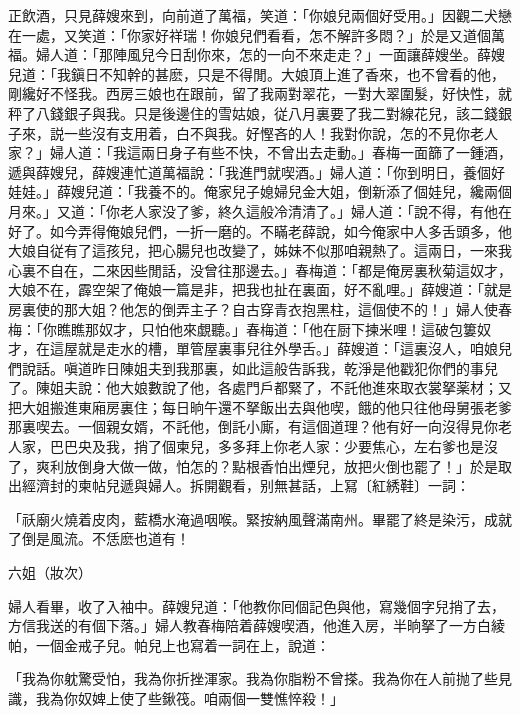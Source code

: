 正飲酒，只見薛嫂來到，向前道了萬福，笑道：「你娘兒兩個好受用。」因觀二犬戀在一處，又笑道：「你家好祥瑞！你娘兒們看看，怎不解許多悶？」於是又道個萬福。婦人道：「那陣風兒今日刮你來，怎的一向不來走走？」一面讓薛嫂坐。薛嫂兒道：「我鎭日不知幹的甚麽，只是不得閒。大娘頂上進了香來，也不曾看的他，剛纔好不怪我。西房三娘也在跟前，留了我兩對翠花，一對大翠圍髮，好快性，就秤了八錢銀子與我。只是後邊住的雪姑娘，従八月裏要了我二對線花兒，該二錢銀子來，説一些沒有支用着，白不與我。好慳吝的人！我對你說，怎的不見你老人家？」婦人道：「我這兩日身子有些不快，不曾出去走動。」春梅一面篩了一鍾酒，遞與薛嫂兒，薛嫂連忙道萬福說：「我進門就喫酒。」婦人道：「你到明日，養個好娃娃。」薛嫂兒道：「我養不的。俺家兒子媳婦兒金大姐，倒新添了個娃兒，纔兩個月來。」又道：「你老人家没了爹，終久這般冷清清了。」婦人道：「說不得，有他在好了。如今弄得俺娘兒們，一折一磨的。不瞞老薛說，如今俺家中人多舌頭多，他大娘自従有了這孩兒，把心腸兒也改變了，姊妹不似那咱親熱了。這兩日，一來我心裏不自在，二來因些閒話，没曾往那邊去。」春梅道：「都是俺房裏秋菊這奴才，大娘不在，霹空架了俺娘一篇是非，把我也扯在裏面，好不亂哩。」薛嫂道：「就是房裏使的那大姐？他怎的倒弄主子？自古穿青衣抱黑柱，這個使不的！」婦人使春梅：「你瞧瞧那奴才，只怕他來覷聽。」春梅道：「他在厨下揀米哩！這破包簍奴才，在這屋就是走水的槽，單管屋裏事兒往外學舌。」薛嫂道：「這裏沒人，咱娘兒們說話。嗔道昨日陳姐夫到我那裏，如此這般告訴我，乾淨是他戳犯你們的事兒了。陳姐夫說：他大娘數說了他，各處門戶都緊了，不託他進來取衣裳拏薬材；又把大姐搬進東廂房裏住；每日晌午還不拏飯出去與他喫，餓的他只往他母舅張老爹那裏喫去。一個親女婿，不託他，倒託小廝，有這個道理？他有好一向沒得見你老人家，巴巴央及我，捎了個柬兒，多多拜上你老人家：少要焦心，左右爹也是沒了，爽利放倒身大做一做，怕怎的？點根香怕出煙兒，放把火倒也罷了！」於是取出經濟封的柬帖兒遞與婦人。拆開觀看，别無甚話，上冩〔紅綉鞋〕一詞：

\begin{myquote}
「祅廟火燒着皮肉，藍橋水淹過咽喉。緊按納風聲滿南州。畢罷了終是染污，成就了倒是風流。不恁麽也道有！

六姐（妝次）

\end{myquote}

婦人看畢，收了入袖中。薛嫂兒道：「他教你囘個記色與他，寫幾個字兒捎了去，方信我送的有個下落。」婦人教春梅陪着薛嫂喫酒，他進入房，半晌拏了一方白綾帕，一個金戒子兒。帕兒上也寫着一詞在上，說道：

\begin{myquote}
「我為你躭驚受怕，我為你折挫渾家。我為你脂粉不曾搽。我為你在人前抛了些見識，我為你奴婢上使了些鍬筏。咱兩個一雙憔悴殺！」
\end{myquote}

